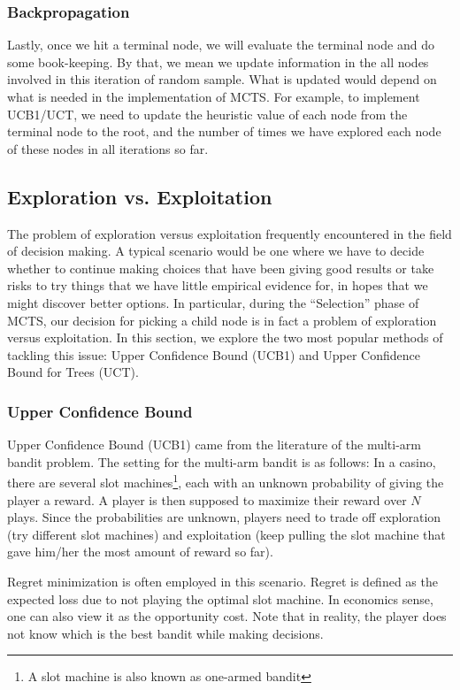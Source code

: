 \documentclass[11pt, a4paper, oneside]{article}
\begin{document}
\subsubsection{Backpropagation}
Lastly, once we hit a terminal node, we will evaluate the terminal node and do some book-keeping. By that, we mean we update information in the all nodes involved in this iteration of random sample. What is updated would depend on what is needed in the implementation of MCTS. For example, to implement UCB1/UCT, we need to update the heuristic value of each node from the terminal node to the root, and the number of times we have explored each node of these nodes in all iterations so far.

\subsection{Exploration vs. Exploitation}
The problem of exploration versus exploitation frequently encountered in the field of decision making. A typical scenario would be one where we have to decide whether to continue making choices that have been giving good results or take risks to try things that we have little empirical evidence for, in hopes that we might discover better options. In particular, during the ``Selection'' phase of MCTS, our decision for picking a child node is in fact a problem of exploration versus exploitation. In this section, we explore the two most popular methods of tackling this issue: Upper Confidence Bound (UCB1) and Upper Confidence Bound for Trees (UCT).

\subsubsection{Upper Confidence Bound}
Upper Confidence Bound (UCB1) came from the literature of the multi-arm bandit problem. The setting for the multi-arm bandit is as follows: In a casino, there are several slot machines\footnote{A slot machine is also known as one-armed bandit}, each with an unknown probability of giving the player a reward. A player is then supposed to maximize their reward over $N$ plays. Since the probabilities are unknown, players need to trade off exploration (try different slot machines) and exploitation (keep pulling the slot machine that gave him/her the most amount of reward so far).

Regret minimization is often employed in this scenario. Regret is defined as the expected loss due to not playing the optimal slot machine. In economics sense, one can also view it as the opportunity cost. Note that in reality, the player does not know which is the best bandit while making decisions.
\end{document}
